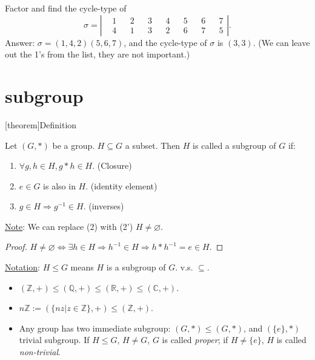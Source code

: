 \documentclass[12pt]{report}
\theoremstyle{definition}
\begin{document}
\begin{ex}
    Factor and find the cycle-type of\[
        \sigma = 
        \left|\begin{align*}
            & 1 && 2 && 3 && 4 && 5 && 6 && 7 \\
            & 4 && 1 && 3 && 2 && 6 && 7 && 5
        \end{align*}\right|.
    \]
    Answer: $\sigma = (1, 4, 2)(5, 6, 7)$, and the cycle-type of $\sigma$ is $(3, 3)$.
    (We can leave out the 1's from the list, they are not important.)
\end{ex}

\section{subgroup}

[theorem]{Definition}
\begin{subgroup}
    Let $(G, *)$ be a group. $H \subseteq G$ a subset. Then $H$ is called a subgroup of $G$ if:
    \begin{enumerate}
        \item $\forall g, h \in H, g * h \in H$. (Closure)
        \item $e \in G$ is also in $H$. (identity element)
        \item $g \in H \Rightarrow{}g^{-1} \in H$. (inverses)
    \end{enumerate}
\end{subgroup}

\underline{Note}: We can replace (2) with (2') $H \neq \varnothing$.

\begin{proof}
    $H \neq \varnothing \iff \exists h \in H \Rightarrow{} h^{-1} \in H
    \Rightarrow{} h * h^{-1} = e \in H$.
\end{proof}

\underline{Notation}: $H \le G$ means $H$ is a subgroup of $G$.
v.s. $\subseteq$.

\begin{ex}
    \begin{itemize}
            \item  $(\mathbb{Z}, +) \le (\mathbb{Q}, +) \le (\mathbb{R}, +) \le (\mathbb{C}, +)$.
            \item $n\mathbb{Z} := (\{nz | z \in \mathbb{Z}\}, +) \le (\mathbb{Z}, +)$.
            \item Any group has two immediate subgroup: $(G, *) \le (G, *)$, and $(\{e\}, *)$ trivial subgroup.
                If $H \le G$, $H \neq G$, $G$ is called \emph{proper};
                if $H \neq \{e\}$, $H$ is called \emph{non-trivial}.
    \end{itemize}
    
   \end{ex}
\end{document}
